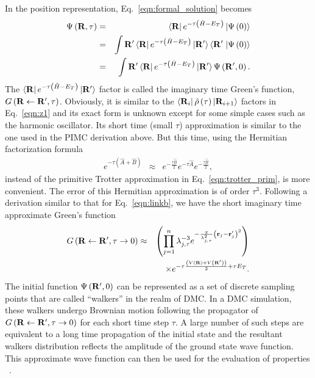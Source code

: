 \documentclass[12pt]{iopart}
\begin{document}
In the position representation, Eq.~\ref{eqn:formal_solution} becomes
\begin{eqnarray}
\Psi\left({\bf R},\tau \right)&=&\left< {\bf R}\right| e^{ -\tau\left(\hat{H} - E_T \right)}\left|\Psi \left(0 \right)\right> \nonumber\\
&=&\int {\bf R'}\left< {\bf R}\right| e^{ -\tau\left(\hat{H} - E_T \right)}\left| {\bf R'} \right>\left<{\bf R'}\right.\left|\Psi \left(0 \right)\right> \nonumber \\
&=&\int {\bf R'}\left< {\bf R}\right| e^{ -\tau\left(\hat{H} - E_T \right)}\left| {\bf R'} \right>\Psi\left({\bf R'},0 \right).
\end{eqnarray}
The
$\left< {\bf R}\right|e^{ -\tau\left(\hat{H} - E_T \right)}\left| {\bf R'} \right>$
factor is called the imaginary time Green's function, $G\left( {\bf R} \leftarrow {\bf R'}, \tau \right)$. Obviously, it is similar to the $\left< {\bf R}_i \right| \hat{\rho}\left( \tau \right) \left| {\bf R}_{i+1} \right>$ factors in Eq.~\ref{eqn:z1} and its exact form is unknown except for some simple cases such as the harmonic oscillator. 
Its short time (small $\tau$) approximation is similar to the one used in the PIMC derivation above.
But this time, using the Hermitian factorization formula~\cite{hermitian_trotter_suzuki}
\begin{eqnarray}
e^{-\tau\left(\hat{A} +\hat{B} \right)}&\approx&e^{ -\frac{\tau\hat{B}}{2} } e^{ -\tau\hat{A} } e^{ -\frac{\tau\hat{B}}{2}},
\end{eqnarray}
instead of the primitive Trotter approximation in Eq.~\ref{eqn:trotter_prim}, is more convenient. 
The error of this Hermitian approximation is of  order  $\tau^3$. 
Following a derivation similar to that  for Eq.~\ref{eqn:linkb}, 
we have the short imaginary time approximate Green's function
\begin{eqnarray}
G\left( {\bf R} \leftarrow {\bf R'}, \tau\rightarrow 0 \right)&\approx&\left(\prod_{j=1}^n \lambda_{j,\tau}^{-3} e^{ -\frac{\pi}{\lambda_{j,\tau}^2} \left( {\bf r}_{j} -{\bf r}_{j}' \right)^2 }\right)\nonumber\\
&&\times e^{ -\tau \frac{\left( V\left( {\bf R}\right)+V\left( {\bf R'}\right) \right) }{2}+\tau E_T}. \label{eqn:green_short}
\end{eqnarray}
The initial function $\Psi\left({\bf R'},0 \right)$ can be represented as a set of discrete sampling points that are called ``walkers'' in the realm of DMC. In a DMC simulation, these walkers undergo Brownian motion following the propagator of $G\left( {\bf R} \leftarrow {\bf R'}, \tau\rightarrow0 \right)$ for each short time step $\tau$. 
A large number of such steps are equivalent to a long time propagation of the initial state and 
the resultant walkers distribution reflects the amplitude of the ground state wave function. 
This approximate wave function can then be used for the evaluation of properties ~\cite{dmc_descendent_weight1,dmc_descent_weight2}.
\end{document}
